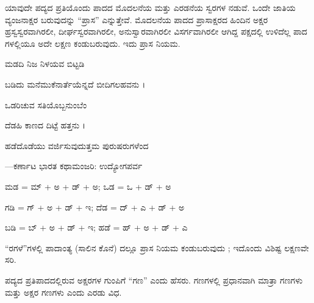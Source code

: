 \vspace{4pt plus 4pt minus 1pt}\hspace{0.5em}ಯಾವುದೇ ಪದ್ಯದ ಪ್ರತಿಯೊಂದು ಪಾದದ ಮೊದಲನೆಯ ಮತ್ತು ಎರಡನೆಯ ಸ್ವರಗಳ ನಡುವೆ. ಒಂದೇ ಜಾತಿಯ ವ್ಯಂಜನಾಕ್ಷರ ಬರುವುದನ್ನು “ಪ್ರಾಸ” ಎನ್ನುತ್ತೇವೆ. ಮೊದಲನೆಯ ಪಾದದ ಪ್ರಾಸಾಕ್ಷರದ ಹಿಂದಿನ ಅಕ್ಷರ ಹ್ರಸ್ವಸ್ವರವಾಗಿರಲೀ, ದೀರ್ಘಸ್ವರವಾಗಿರಲೀ, ಅನುಸ್ವಾರವಾಗಿರಲೀ ವಿಸರ್ಗವಾಗಿರಲೀ ಆಗಿದ್ದ ಪಕ್ಷದಲ್ಲಿ ಉಳಿದೆಲ್ಲ ಪಾದ ಗಳಲ್ಲಿಯೂ ಅದೇ ಲಕ್ಷಣ ಕಂಡುಬರುವುದು. ಇದು ಪ್ರಾಸ ನಿಯಮ.\par

\vspace{3pt plus 2pt}\noindent\hspace*{1.2em}\par\vspace{1pt}

\indent ಮಡದಿ ನಿಜ ನಿಳಯವ ಬಿಟ್ಟಡಿ\par


\begin{kbvverse}
\noindent ಬಡಿದು ಮನೆಮುಕೆನಾರ್ತೆಯೆನ್ನದೆ ಬೀದಿಗಲಹವನು ।
\end{kbvverse}

\indent ಒಡರಿಚುವ ಸತಿಯೊಬ್ಬನುಂಬೆಂ\par

\begin{kbvverse}
\noindent ದೆಡಹಿ ಕಾಣದ ದಿಟ್ಟೆ ಹತ್ತನು ।
\end{kbvverse}

\indent ಹಡೆದೊಡೆಯು ವರ್ಜಿಸುವುದುತ್ತಮ ಪುರುಷರುಗಳೆಂದ\par

\noindent\hfill{\fontsize{9.5pt}{12.5pt}\selectfont\color{kbvgrey}—ಕರ್ಣಾಟ ಭಾರತ ಕಥಾಮಂಜರಿ: ಉದ್ಯೋಗಪರ್ವ}\par\vspace{3pt plus 2pt}

\indent ಮಡ = ಮ್ + ಅ + ಡ್ + ಅ; ಒಡ = ಒ + ಡ್ + ಅ\par

\indent ಗಡಿ = ಗ್ + ಅ + ಡ್ + ಇ; ದೆಡ = ದ್ + ಎ + ಡ್ + ಅ\par

\indent ಬಡಿ = ಬ್ + ಅ + ಡ್ + ಇ; ಹಡೆ = ಹ್ + ಅ + ಡ್ + ಎ\par

\begin{kbvnote}
\hspace{0.5em}“ರಗಳೆ”ಗಳಲ್ಲಿ ಪಾದಾಂತ್ಯ (ಸಾಲಿನ ಕೊನೆ) ದಲ್ಲೂ ಪ್ರಾಸ ನಿಯಮ ಕಂಡುಬರುವುದು ; ಇದೊಂದು ವಿಶಿಷ್ಟ ಲಕ್ಷಣವೇ ಸರಿ.
\end{kbvnote}

\vspace{4pt plus 4pt minus 1pt}\hspace{0.5em}ಪದ್ಯದ ಪ್ರತಿಪಾದದಲ್ಲಿರುವ ಅಕ್ಷರಗಳ ಗುಂಪಿಗೆ “ಗಣ” ಎಂದು ಹೆಸರು. ಗಣಗಳಲ್ಲಿ ಪ್ರಧಾನವಾಗಿ ಮಾತ್ರಾ ಗಣಗಳು ಮತ್ತು ಅಕ್ಷರ ಗಣಗಳು ಎಂದು ಎರಡು ವಿಧ.\par
